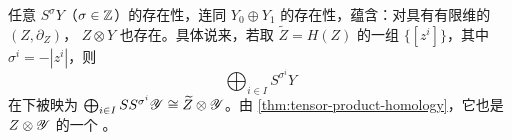 \begin{remark}\label{thm:tensor-product-existence}
任意\trSuspension{} $S^{\sigma}Y$（$\sigma\in\mathbb{Z}$）的存在性，连同\trDirectSum{}%
$Y_0\oplus Y_1$ 的存在性，蕴含：对具有有限维\trCohomology{}的\trComplex{}%
$(Z,\partial_Z)$，\trTensorProduct{} $Z\otimes Y$ 也存在。具体说来，若取
$\widetilde{Z}=H(Z)$ 的一组\trBasis{} $\{[z^i]\}$，其中 $\sigma^i=-|z^i|$，则
\begin{equation*}
\bigoplus_{i\in I}S^{\sigma^i}Y
\end{equation*}
在\trYonedaEmbedding{}下被映为
$\bigoplus_{i\in I}SS^{\sigma^i}\mathscr{Y}\cong\widetilde{Z}\otimes\mathscr{Y}$。由%
\cref{thm:tensor-product-homology}，它也是 $Z\otimes\mathscr{Y}$ 的一个%
\trQuasiRepresent\trObject。
\end{remark}
